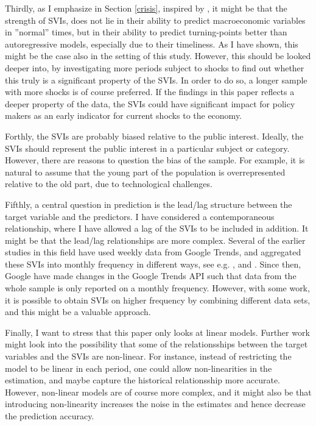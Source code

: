 Thirdly, as I emphasize in Section \ref{crisis}, inspired by \textcite{choi2012}, it might be that the strength of SVIs, does not lie in their ability to predict macroeconomic variables in ''normal'' times, but in their ability to predict turning-points better than autoregressive models, especially due to their timeliness. As I have shown, this might be the case also in the setting of this study. However, this should be looked deeper into, by investigating more periods subject to shocks to find out whether this truly is a significant property of the SVIs. In order to do so, a longer sample with more shocks is of course preferred. If the findings in this paper reflects a deeper property of the data, the SVIs could have significant impact for policy makers as an early indicator for current shocks to the economy.

Forthly, the SVIs are probably biased relative to the public interest. Ideally, the SVIs should represent the public interest in a particular subject or category. However, there are reasons to question the bias of the sample. For example, it is natural to assume that the young part of the population is overrepresented relative to the old part, due to technological challenges.

Fifthly, a central question in prediction is the lead/lag structure between the target variable and the predictors. I have considered a contemporaneous relationship, where I have allowed a lag of the SVIs to be included in addition. It might be that the lead/lag relationships are more complex. Several of the earlier studies in this field have used weekly data from Google Trends, and aggregated these SVIs into monthly frequency in different ways, see e.g. \textcite{anvik2010}, \textcite{choi2012} and \textcite{boe2011}. Since then, Google have made changes in the Google Trends API such that data from the whole sample is only reported on a monthly frequency. However, with some work, it is possible to obtain SVIs on higher frequency by combining different data sets, and this might be a valuable approach.

Finally, I want to stress that this paper only looks at linear models. Further work might look into the possibility that some of the relationsships between the target variables and the SVIs are non-linear. For instance, instead of restricting the model to be linear in each period, one could allow non-linearities in the estimation, and maybe capture the historical relationsship more accurate. However, non-linear models are of course more complex, and it might also be that introducing non-linearity increases the noise in the estimates and hence decrease the prediction accuracy.